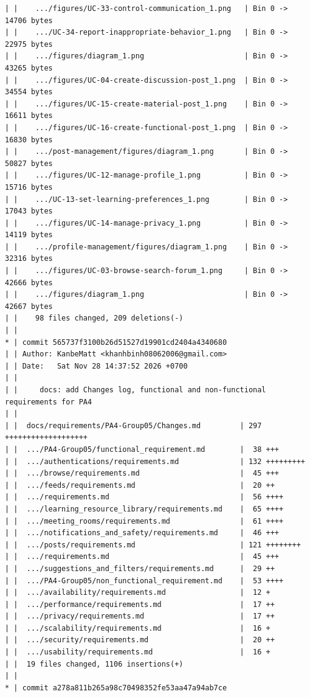 \documentclass[12pt]{article}
\begin{document}
\begin{lstlisting}[numbers=none,breaklines=true]
| |    .../figures/UC-33-control-communication_1.png   | Bin 0 -> 14706 bytes
| |    .../UC-34-report-inappropriate-behavior_1.png   | Bin 0 -> 22975 bytes
| |    .../figures/diagram_1.png                       | Bin 0 -> 43265 bytes
| |    .../figures/UC-04-create-discussion-post_1.png  | Bin 0 -> 34554 bytes
| |    .../figures/UC-15-create-material-post_1.png    | Bin 0 -> 16611 bytes
| |    .../figures/UC-16-create-functional-post_1.png  | Bin 0 -> 16830 bytes
| |    .../post-management/figures/diagram_1.png       | Bin 0 -> 50827 bytes
| |    .../figures/UC-12-manage-profile_1.png          | Bin 0 -> 15716 bytes
| |    .../UC-13-set-learning-preferences_1.png        | Bin 0 -> 17043 bytes
| |    .../figures/UC-14-manage-privacy_1.png          | Bin 0 -> 14119 bytes
| |    .../profile-management/figures/diagram_1.png    | Bin 0 -> 32316 bytes
| |    .../figures/UC-03-browse-search-forum_1.png     | Bin 0 -> 42666 bytes
| |    .../figures/diagram_1.png                       | Bin 0 -> 42667 bytes
| |    98 files changed, 209 deletions(-)
| |
* | commit 565737f3100b26d51527d19901cd2404a4340680
| | Author: KanbeMatt <khanhbinh08062006@gmail.com>
| | Date:   Sat Nov 28 14:37:52 2026 +0700
| |
| |     docs: add Changes log, functional and non-functional requirements for PA4
| |
| |  docs/requirements/PA4-Group05/Changes.md         | 297 +++++++++++++++++++
| |  .../PA4-Group05/functional_requirement.md        |  38 +++
| |  .../authentications/requirements.md              | 132 +++++++++
| |  .../browse/requirements.md                       |  45 +++
| |  .../feeds/requirements.md                        |  20 ++
| |  .../requirements.md                              |  56 ++++
| |  .../learning_resource_library/requirements.md    |  65 ++++
| |  .../meeting_rooms/requirements.md                |  61 ++++
| |  .../notifications_and_safety/requirements.md     |  46 +++
| |  .../posts/requirements.md                        | 121 ++++++++
| |  .../requirements.md                              |  45 +++
| |  .../suggestions_and_filters/requirements.md      |  29 ++
| |  .../PA4-Group05/non_functional_requirement.md    |  53 ++++
| |  .../availability/requirements.md                 |  12 +
| |  .../performance/requirements.md                  |  17 ++
| |  .../privacy/requirements.md                      |  17 ++
| |  .../scalability/requirements.md                  |  16 +
| |  .../security/requirements.md                     |  20 ++
| |  .../usability/requirements.md                    |  16 +
| |  19 files changed, 1106 insertions(+)
| |
* | commit a278a811b265a98c70498352fe53aa47a94ab7ce

\end{lstlisting}
\end{document}
